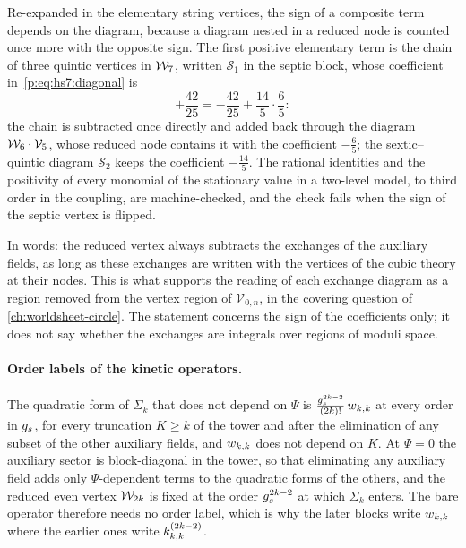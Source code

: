 Re-expanded in the elementary string vertices, the sign of a composite term depends on the diagram, because a diagram nested in a reduced node is counted once more with the opposite sign.
The first positive elementary term is the chain of three quintic vertices in $\mathcal{W}_{7}$, written $\mathcal S_1$ in the septic block, whose coefficient in~\eqref{p:eq:hs7:diagonal} is
\begin{equation}
  \label{ch3:eq:chain-sign}
  + \frac{42}{25}
    = - \frac{42}{25}
      + \frac{14}{5} \cdot \frac{6}{5}:
\end{equation}
the chain is subtracted once directly and added back through the diagram $\mathcal{W}_{6} \cdot \mathcal{V}_{5}$, whose reduced node contains it with the coefficient $- \tfrac{6}{5}$; the sextic--quintic diagram $\mathcal S_2$ keeps the coefficient $- \tfrac{14}{5}$.
The rational identities and the positivity of every monomial of the stationary value in a two-level model, to third order in the coupling, are machine-checked, and the check fails when the sign of the septic vertex is flipped.

In words: the reduced vertex always subtracts the exchanges of the auxiliary fields, as long as these exchanges are written with the vertices of the cubic theory at their nodes.
This is what supports the reading of each exchange diagram as a region removed from the vertex region of $\mathcal V_{0, n}$, in the covering question of \cref{ch:worldsheet-circle}.
The statement concerns the sign of the coefficients only; it does not say whether the exchanges are integrals over regions of moduli space.

\paragraph{Order labels of the kinetic operators.}

\noindent{} The quadratic form of $\Sigma_k$ that does not depend on $\Psi$ is $\tfrac{g_s^{2 k - 2}}{(2 k)!} \, w_{k,k}$ at every order in $g_s$, for every truncation $K \ge k$ of the tower and after the elimination of any subset of the other auxiliary fields, and $w_{k,k}$ does not depend on $K$.
At $\Psi = 0$ the auxiliary sector is block-diagonal in the tower, so that eliminating any auxiliary field adds only $\Psi$-dependent terms to the quadratic forms of the others, and the reduced even vertex $\mathcal{W}_{2 k}$ is fixed at the order $g_s^{2 k - 2}$ at which $\Sigma_k$ enters.
The bare operator therefore needs no order label, which is why the later blocks write $w_{k,k}$ where the earlier ones write $\kin{k}{}{2 k - 2}$.

